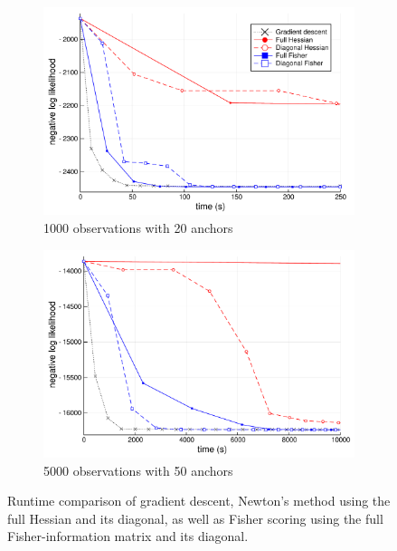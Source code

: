 \documentclass{article}
\numberwithin{equation}{section}
\begin{document}
\begin{figure}[t!]
  \begin{subfigure}[t]{0.5\textwidth}
    \includegraphics[width=\textwidth]{figures/timing/p1000-a20-plot.pdf}
    \caption{1000 observations with 20 anchors}
  \end{subfigure}%
  \begin{subfigure}[t]{0.5\textwidth}
    \includegraphics[width=\textwidth]{figures/timing/p5000-a50-plot.pdf}
    \caption{5000 observations with 50 anchors}
  \end{subfigure}
  \caption{Runtime comparison of gradient descent, Newton's method using the full Hessian and its diagonal, as well as Fisher scoring using the full Fisher-information matrix and its diagonal.}
\end{figure}
\end{document}
